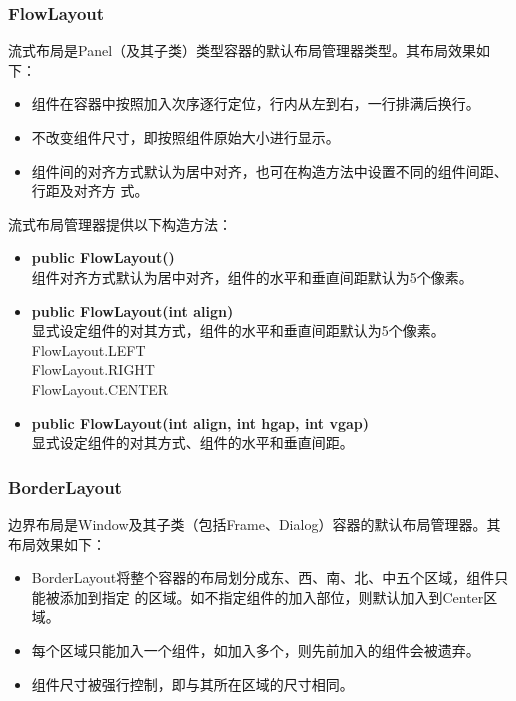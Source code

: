 \subsubsection{FlowLayout}

流式布局是Panel（及其子类）类型容器的默认布局管理器类型。其布局效果如下：

\begin{itemize}\kai
\item 组件在容器中按照加入次序逐行定位，行内从左到右，一行排满后换行。
\item 不改变组件尺寸，即按照组件原始大小进行显示。
\item 组件间的对齐方式默认为居中对齐，也可在构造方法中设置不同的组件间距、行距及对齐方
  式。
\end{itemize}

流式布局管理器提供以下构造方法：

\begin{itemize}\kai
\item {\bf public FlowLayout()}\\
  组件对齐方式默认为居中对齐，组件的水平和垂直间距默认为5个像素。

\item {\bf public FlowLayout(int align)}\\
  显式设定组件的对其方式，组件的水平和垂直间距默认为5个像素。\\
  FlowLayout.LEFT \\
  FlowLayout.RIGHT\\
  FlowLayout.CENTER\\

\item {\bf public FlowLayout(int align, int hgap, int vgap)}\\
  显式设定组件的对其方式、组件的水平和垂直间距。
\end{itemize}



\subsubsection{BorderLayout}

边界布局是Window及其子类（包括Frame、Dialog）容器的默认布局管理器。其布局效果如下：

\begin{itemize}
\item BorderLayout将整个容器的布局划分成东、西、南、北、中五个区域，组件只能被添加到指定
  的区域。如不指定组件的加入部位，则默认加入到Center区域。
\item 每个区域只能加入一个组件，如加入多个，则先前加入的组件会被遗弃。
\item 组件尺寸被强行控制，即与其所在区域的尺寸相同。
\end{itemize}

